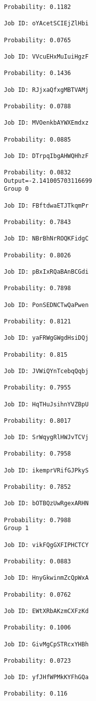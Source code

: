 \documentclass[11pt]{article}
\begin{document}
\begin{Verbatim}[commandchars=\\\{\}]
Probability: 0.1182

Job ID: oYAcetSCIEjZlHbi

Probability: 0.0765

Job ID: VVcuEHxMuIuiHgzF

Probability: 0.1436

Job ID: RJjxaQfxgMBTVAMj

Probability: 0.0788

Job ID: MVOenkbAYWXEmdxz

Probability: 0.0885

Job ID: DTrpqIbgAHWQHhzF

Probability: 0.0832
Output=-2.141005703116699
Group 0

Job ID: FBftdwaETJTkqmPr

Probability: 0.7843

Job ID: NBrBhNrROQKFidgC

Probability: 0.8026

Job ID: pBxIxRQaBAnBCGdi

Probability: 0.7898

Job ID: PonSEDNCTwQaPwen

Probability: 0.8121

Job ID: yaFRWgGWgdHsiDQj

Probability: 0.815

Job ID: JVWiQYnTcebqQqbj

Probability: 0.7955

Job ID: HqTHuJsihnYVZBpU

Probability: 0.8017

Job ID: SrWqygRlHWJvTCVj

Probability: 0.7958

Job ID: ikemprVRifGJPkyS

Probability: 0.7852

Job ID: bOTBQzUwRgexARHN

Probability: 0.7988
Group 1

Job ID: vikFQgGXFIPHCTCY

Probability: 0.0883

Job ID: HnyGkwinmZcQpWxA

Probability: 0.0762

Job ID: EWtXRbAKzmCXFzKd

Probability: 0.1006

Job ID: GivMgCpSTRcxYHBh

Probability: 0.0723

Job ID: yfJHfWPMkKYFhGQa

Probability: 0.116


\end{Verbatim}
\end{document}

